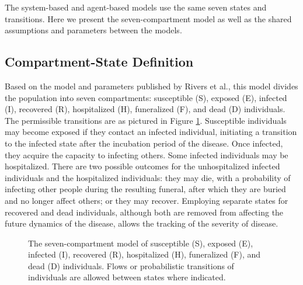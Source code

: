The system-based and agent-based models use the same seven states and transitions. Here we present the seven-compartment model as well as the shared assumptions and parameters between the models.%

\subsection{Compartment-State Definition}
Based on the model and parameters published by Rivers et al.\cite{Rivers2014}, this model divides the population into seven compartments: susceptible (S), exposed (E), infected (I), recovered (R), hospitalized (H), funeralized (F), and dead (D) individuals. The permissible transitions are as pictured in Figure \ref{fig:states}. Susceptible individuals may become exposed if they contact an infected individual, initiating a transition to the infected state after the incubation period of the disease. Once infected, they acquire the capacity to infecting others. Some infected individuals may be hospitalized. There are two possible outcomes for the unhospitalized infected individuals and the hospitalized individuals: they may die, with a probability of infecting other people during the resulting funeral, after which they are buried and no longer affect others; or they may recover. Employing separate states for recovered and dead individuals, although both are removed from affecting the future dynamics of the disease, allows the tracking of the severity of disease. 

\begin{figure}[h!]
\begin{center}
\end{center}
\caption{The seven-compartment model of susceptible (S), exposed (E), infected (I), recovered (R), hospitalized (H), funeralized (F), and dead (D) individuals. Flows or probabilistic transitions of individuals are allowed between states where indicated.}
\label{fig:states}
\end{figure}

